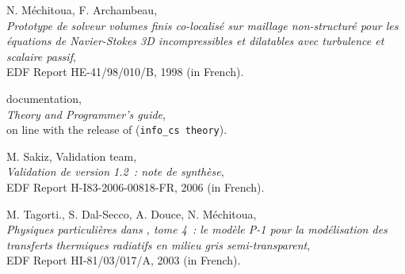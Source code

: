 \begin{thebibliography}{3}
 {\sc N. Méchitoua, F. Archambeau},\\
{\em Prototype de solveur volumes finis co-localisé sur maillage non-structuré
pour les équations de Navier-Stokes 3D incompressibles et dilatables avec
turbulence et scalaire passif},\\
EDF Report HE-41/98/010/B, 1998 (in French).

 {\sc \CS documentation},\\
{\em \CS \verscs Theory and Programmer's guide},\\
on line with the release of \CS \verscs (\texttt{info\_cs theory}).

 {\sc M. Sakiz, Validation team},\\
{\em Validation de \CS version 1.2~: note de synthèse},\\
EDF Report H-I83-2006-00818-FR, 2006 (in French).

 {\sc M. Tagorti., S. Dal-Secco, A. Douce, N. Méchitoua},\\
{\em Physiques particulières dans \CS,
tome 4~: le modèle P-1 pour la modélisation des transferts thermiques
radiatifs en milieu gris semi-transparent},\\
EDF Report HI-81/03/017/A, 2003 (in French).

\end{thebibliography}


